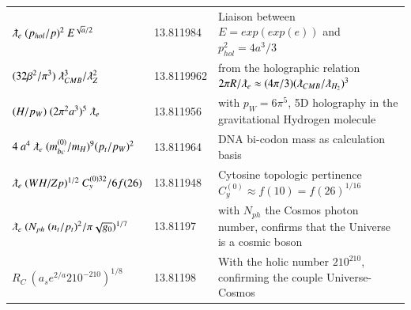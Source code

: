 \documentclass[a4paper,9pt]{article}
\begin{document}
\begin{table}
\begin{tabular}{lll}
  
 
  $ \lambdabar_e ~(p_{hol}/p)^2~ E^{\sqrt a/2}$ & 13.811984 & Liaison between $E = exp(exp(e))$ and $p_{hol}^2 = 4a^3/3$   \\
  
  
  
  
  
 $ (32 \beta^2 /\pi^3) ~\lambdabar_{CMB}^3/ \lambdabar_Z^2$ & 13.8119962 & from the holographic relation $2\pi R/\lambdabar_e \approx (4\pi/3) (\lambdabar_{CMB}/\lambdabar_{H_2})^3$ \cite{Sanchez2}\\ 
  
  
  
  
  
  
 $(H/p_W)~(2\pi^2 a^3)^5~ \lambdabar_{e} $ & 13.811956 & with $p_W = 6\pi^5$, 5D holography in the gravitational Hydrogen molecule \cite{Sanchez3}  \\
 
 
 
   
  
  
  $ 4 ~a^4 ~\lambdabar_{e} ~(m_{bc}^{(0)}/m_H)^9 (p_t/p_W)^2  $ & 13.811964 & DNA bi-codon mass as calculation basis  \\
  
  
  $ \lambdabar_{e}~ (WH/Zp)^{1/2}~C_y^{(0)32}/6f(26)   $ & 13.811948 & Cytosine topologic pertinence  $C_y^{(0)} \approx f(10)= f(26)^{1/16} $  \\
  
  $ \lambdabar_{e}~ (N_{ph}  ~(n_t/p_t)^2/\pi \sqrt{g_0})^{1/7} $ & 13.81197 & with $N_{ph}$ the Cosmos photon number, confirms that the Universe is a cosmic boson \\
  
   
 $R_C ~(a_se^{2/a}210^{-210})^{1/8}$  & 13.81198    & With the holic number $210^{210}$, confirming the couple Universe- Cosmos \\
 

\end{tabular}
\end{table}
\end{document}
